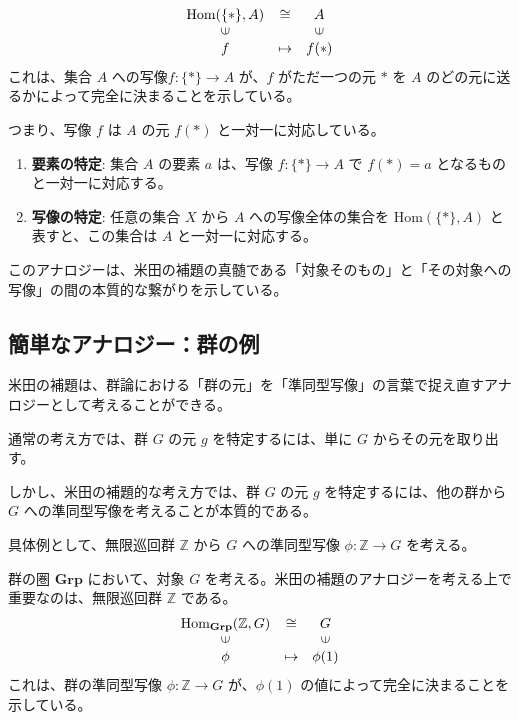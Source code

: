 \documentclass[uplatex,a4j,12pt,dvipdfmx]{jsarticle}
\begin{document}
\[
	\begin{array}{ccc} \text{Hom}(\{*\}, A)& \cong & A \\ \rotatebox{90}{${\in}$} && \rotatebox{90}{${\in}$} \\ f& \mapsto & f(*) \end{array}
\]
これは、集合 $A$ への写像$f: \{*\} \to A$ が、$f$ がただ一つの元 $*$ を $A$ のどの元に送るかによって完全に決まることを示している。

つまり、写像 $f$ は $A$ の元 $f( * )$ と一対一に対応している。

\begin{enumerate}
	\item \textbf{要素の特定}: 集合 $A$ の要素 $a$ は、写像 $f: \{*\} \to A$ で $f(*) = a$ となるものと一対一に対応する。
	\item \textbf{写像の特定}: 任意の集合 $X$ から $A$ への写像全体の集合を $\text{Hom}(\{*\}, A)$ と表すと、この集合は $A$ と一対一に対応する。
\end{enumerate}

このアナロジーは、米田の補題の真髄である「対象そのもの」と「その対象への写像」の間の本質的な繋がりを示している。





\subsection{簡単なアナロジー：群の例}

米田の補題は、群論における「群の元」を「準同型写像」の言葉で捉え直すアナロジーとして考えることができる。

通常の考え方では、群 $G$ の元 $g$ を特定するには、単に $G$ からその元を取り出す。

しかし、米田の補題的な考え方では、群 $G$ の元 $g$ を特定するには、他の群から $G$ への準同型写像を考えることが本質的である。

具体例として、無限巡回群 $\mathbb{Z}$ から $G$ への準同型写像 $\phi: \mathbb{Z} \to G$ を考える。

群の圏 $\mathbf{Grp}$ において、対象 $G$ を考える。米田の補題のアナロジーを考える上で重要なのは、無限巡回群 $\mathbb{Z}$ である。
\[
	\begin{array}{ccc} \text{Hom}_{\mathbf{Grp}}(\mathbb{Z}, G)& \cong & G \\ \rotatebox{90}{${\in}$} && \rotatebox{90}{${\in}$} \\ \phi& \mapsto & \phi(1) \end{array}
\]
これは、群の準同型写像 $\phi: \mathbb{Z} \to G$ が、$\phi(1)$ の値によって完全に決まることを示している。
\end{document}
